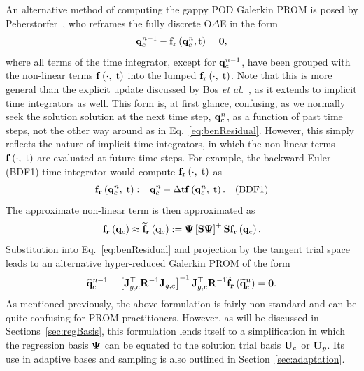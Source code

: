 An alternative method of computing the gappy POD Galerkin PROM is posed by Peherstorfer~\cite{Peherstorfer2020Adaptive}, who reframes the fully discrete O$\Delta$E in the form
%
\begin{equation}\label{eq:benResidual}
	\mathbf{q}_{c}^{n-1} - \mathbf{f}_{\mathbf{r}}\left(\mathbf{q}_{c}^{n}, \text{t}\right) = \mathbf{0},
\end{equation}
%
where all terms of the time integrator, except for $\mathbf{q}_{c}^{n - 1}$, have been grouped with the non-linear terms $\mathbf{f} \left(\cdot, \; \text{t}\right)$ into the lumped $\mathbf{f}_{\mathbf{r}}\left(\cdot, \; \text{t}\right)$. Note that this is more general than the explicit update discussed by Bos \textit{et al.}~\cite{Bos2004}, as it extends to implicit time integrators as well. This form is, at first glance, confusing, as we normally seek the solution solution at the next time step, $\mathbf{q}_{c}^{n}$, as a function of past time steps, not the other way around as in Eq.~\ref{eq:benResidual}. However, this simply reflects the nature of implicit time integrators, in which the non-linear terms $\mathbf{f} \left(\cdot, \; \text{t}\right)$ are evaluated at future time steps. For example, the backward Euler (BDF1) time integrator would compute $\mathbf{f}_{\mathbf{r}}\left(\cdot, \; \text{t}\right)$ as
%
\begin{equation}
	\mathbf{f}_{\mathbf{r}}\left(\mathbf{q}_{c}^{n}, \; \text{t}\right) := \mathbf{q}_{c}^{n} - \Delta \text{t} \mathbf{f} \left(\mathbf{q}_{c}^{n}, \; \text{t}\right). \quad \text{(BDF1)}
\end{equation}
%
The approximate non-linear term is then approximated as
%
\begin{equation}
	\rhsResFunc{\consVec} \approx \rhsResApproxFunc{\consVec} \defEq \deimBasis \left[\sampMat \deimBasis \right]^+ \sampMat \rhsResFunc{\consVec}.
\end{equation}
%
Substitution into Eq.~\ref{eq:benResidual} and projection by the tangent trial space leads to an alternative hyper-reduced Galerkin PROM of the form
%
\begin{equation}
    \consVecCoef^{\timeIdx-1} - \left[\jacobDecodeCons^\top \resScaleInv \jacobDecodeCons\right]^{-1} \jacobDecodeCons^\top \resScaleInv \rhsResApproxFunc{\consVecRom^{\timeIdx}} = \zeroVec.
\end{equation}
%
As mentioned previously, the above formulation is fairly non-standard and can be quite confusing for PROM practitioners. However, as will be discussed in Sections~\ref{sec:regBasis}, this formulation lends itself to a simplification in which the regression basis $\deimBasis$ can be equated to the solution trial basis $\consTrial$ or $\primTrial$. Its use in adaptive bases and sampling is also outlined in Section~\ref{sec:adaptation}.

